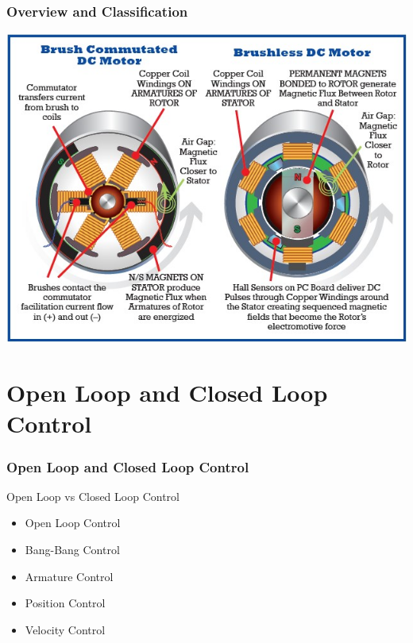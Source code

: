 \documentclass[fleqn]{beamer} %
\newcommand{\sectiontitleI}{Overview and Classification}
\newcommand{\sectiontitleII}{Open Loop and Closed Loop Control}
\begin{document}
	\begin{frame}[label=sectionI] \small
		\frametitle{\sectiontitleI}	
		
		\includegraphics[scale=0.5]{images/brushed_brushless.jpg}

	\end{frame}


\section{\sectiontitleII}	

	\begin{frame} \small
		\frametitle{\sectiontitleII}

		Open Loop vs Closed Loop Control
		\begin{itemize}
			\item Open Loop Control
			\item Bang-Bang Control
			\item Armature Control
			\item Position Control
			\item Velocity Control
		\end{itemize}

	\end{frame}
\end{document}
